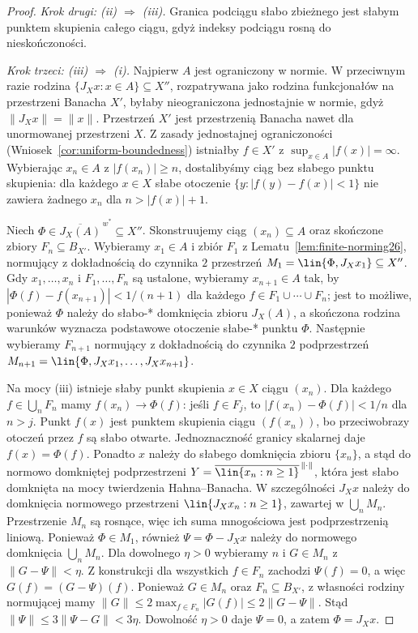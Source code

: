 \begin{proof}
\emph{Krok drugi: (ii) $\Rightarrow$ (iii).}
Granica podciągu słabo zbieżnego jest słabym punktem skupienia
całego ciągu, gdyż indeksy podciągu rosną do nieskończoności.

\emph{Krok trzeci: (iii) $\Rightarrow$ (i).}
Najpierw $A$ jest ograniczony w normie. W przeciwnym razie
rodzina $\{J_Xx:x\in A\}\subseteq X''$, rozpatrywana jako
rodzina funkcjonałów na przestrzeni Banacha $X'$, byłaby
nieograniczona jednostajnie w normie, gdyż
$\|J_Xx\|=\|x\|$. Przestrzeń $X'$ jest przestrzenią Banacha nawet
dla unormowanej przestrzeni $X$. Z zasady jednostajnej
ograniczoności (Wniosek~\ref{cor:uniform-boundedness})
istniałby $f\in X'$ z
$\sup_{x\in A}|f(x)|=\infty$. Wybierając $x_n\in A$ z
$|f(x_n)|\ge n$, dostalibyśmy ciąg bez słabego punktu
skupienia: dla każdego $x\in X$ słabe otoczenie
$\{y:|f(y)-f(x)|<1\}$ nie zawiera żadnego $x_n$
dla $n>|f(x)|+1$.

Niech $\Phi\in\overline{J_X(A)}^{\,w^\ast}\subseteq X''$.
Skonstruujemy ciąg $(x_n)\subseteq A$ oraz skończone
zbiory $F_n\subseteq B_{X'}$. Wybieramy $x_1\in A$ i zbiór
$F_1$ z Lematu~\ref{lem:finite-norming26}, normujący z dokładnością
do czynnika $2$ przestrzeń
$M_1=\lin\{\Phi,J_Xx_1\}\subseteq X''$.
Gdy $x_1,\ldots,x_n$ i $F_1,\ldots,F_n$ są ustalone,
wybieramy $x_{n+1}\in A$ tak, by
$|\Phi(f)-f(x_{n+1})|<1/(n+1)$ dla każdego
$f\in F_1\cup\cdots\cup F_n$; jest to możliwe, ponieważ
$\Phi$ należy do słabo-* domknięcia zbioru $J_X(A)$,
a skończona rodzina warunków wyznacza
podstawowe otoczenie słabe-* punktu $\Phi$.
Następnie wybieramy $F_{n+1}$ normujący z dokładnością
do czynnika $2$ podprzestrzeń
$M_{n+1}=\lin\{\Phi,J_Xx_1,\ldots,J_Xx_{n+1}\}$.

Na mocy (iii) istnieje słaby punkt skupienia $x\in X$
ciągu $(x_n)$. Dla każdego $f\in\bigcup_nF_n$ mamy
$f(x_n)\to\Phi(f)$: jeśli $f\in F_j$, to
$|f(x_n)-\Phi(f)|<1/n$ dla $n>j$.
Punkt $f(x)$ jest punktem skupienia ciągu $(f(x_n))$,
bo przeciwobrazy otoczeń przez $f$ są słabo otwarte.
Jednoznaczność granicy skalarnej daje $f(x)=\Phi(f)$.
Ponadto $x$ należy do słabego domknięcia zbioru
$\{x_n\}$, a stąd do normowo domkniętej podprzestrzeni
$Y=\overline{\lin\{x_n:n\ge1\}}^{\,\|\cdot\|}$,
która jest słabo domknięta na mocy twierdzenia Hahna--Banacha.
W szczególności $J_Xx$ należy do domknięcia normowego
przestrzeni $\lin\{J_Xx_n:n\ge1\}$, zawartej w
$\bigcup_nM_n$. Przestrzenie $M_n$ są rosnące,
więc ich suma mnogościowa jest podprzestrzenią liniową.
Ponieważ $\Phi\in M_1$, również
$\Psi=\Phi-J_Xx$ należy do normowego domknięcia
$\bigcup_nM_n$. Dla dowolnego $\eta>0$ wybieramy
$n$ i $G\in M_n$ z $\|G-\Psi\|<\eta$. Z konstrukcji dla wszystkich
$f\in F_n$ zachodzi $\Psi(f)=0$, a więc
$G(f)=(G-\Psi)(f)$.
Ponieważ $G\in M_n$ oraz $F_n\subseteq B_{X'}$,
z własności rodziny normującej mamy
$\|G\|\le2\max_{f\in F_n}|G(f)|\le2\|G-\Psi\|$.
Stąd $\|\Psi\|\le3\|\Psi-G\|<3\eta$.
Dowolność $\eta>0$ daje $\Psi=0$, a zatem $\Phi=J_Xx$.


\end{proof}
